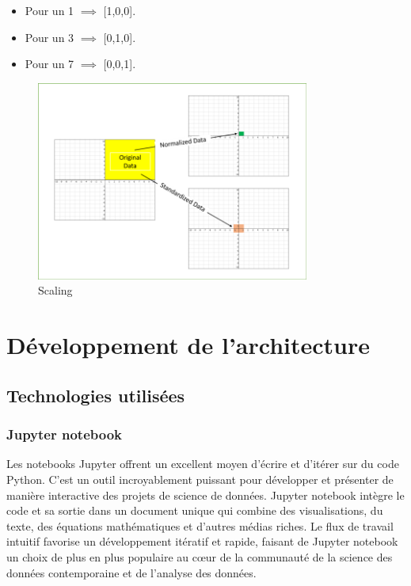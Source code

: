 \documentclass[oneside,13pt,a4paper]{report}
\begin{document}
\begin{itemize}
	\item Pour un 1 $\implies$ [1,0,0].
	\item Pour un 3 $\implies$ [0,1,0].
	\item Pour un 7 $\implies$ [0,0,1].
\end{itemize}

\begin{figure}[h!]
	\begin{center}
		\includegraphics[width=0.8\textwidth]{img/normalisation.png}
	\end{center}
	\caption{Scaling}
\end{figure}



\chapter{Développement de l’architecture}

\section{Technologies utilisées}

\subsection{Jupyter notebook}

Les notebooks Jupyter offrent un excellent moyen d'écrire et d'itérer sur du code Python. C'est un outil incroyablement puissant pour développer et présenter de manière interactive des projets de science de données. Jupyter notebook intègre le code et sa sortie dans un document unique qui combine des visualisations, du texte, des équations mathématiques et d'autres médias riches. Le flux de travail intuitif favorise un développement itératif et rapide, faisant de Jupyter notebook un choix de plus en plus populaire au cœur de la communauté de la science des données contemporaine et de l'analyse des données.
\end{document}
